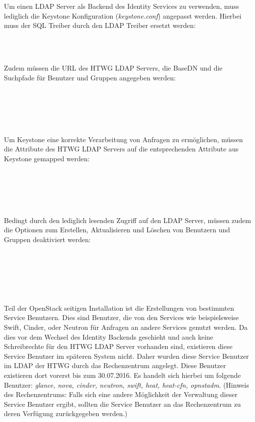 Um einen LDAP Server als Backend des Identity Services zu verwenden, muss lediglich die Keystone Konfiguration (\emph{keystone.conf}) angepasst werden. Hierbei muss der SQL Treiber durch den LDAP Treiber ersetzt werden:

\code{[identity]}\\
\\

Zudem müssen die URL des HTWG LDAP Servers, die BaseDN und die Suchpfade für Benutzer und Gruppen angegeben werden:

\code{[ldap]}\\
\\
\\
\\

Um Keystone eine korrekte Verarbeitung von Anfragen zu ermöglichen, müssen die Attribute des HTWG LDAP Servers auf die entsprechenden Attribute aus Keystone gemapped werden:

\\
\\
\\
\\

Bedingt durch den lediglich lesenden Zugriff auf den LDAP Server, müssen zudem die Optionen zum Erstellen, Aktualisieren und Löschen von Benutzern und Gruppen deaktiviert werden:

\\
\\

\\
\\

Teil der OpenStack seitigen Installation ist die Erstellungen von bestimmten Service Benutzern. Dies sind Benutzer, die von den Services wie beispielsweise Swift, Cinder, oder Neutron für Anfragen an andere Services genutzt werden. Da dies vor dem Wechsel des Identity Backends geschieht und auch keine Schreibrechte für den HTWG LDAP Server vorhanden sind, existieren diese Service Benutzer im späteren System nicht. Daher wurden diese Service Benutzer im LDAP der HTWG durch das Rechenzentrum angelegt. Diese Benutzer existieren dort vorerst bis zum 30.07.2016. Es handelt sich hierbei um folgende Benutzer:
\emph{glance, nova, cinder, neutron, swift, heat, heat-cfn, opnstadm}. (Hinweis des Rechenzentrums: Falls sich eine andere Möglichkeit der Verwaltung dieser Service Benutzer ergibt, sollten die Service Benutzer an das Rechenzentrum zu deren Verfügung zurückgegeben werden.)

